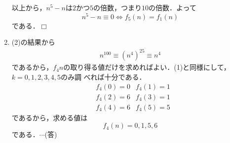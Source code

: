 \documentclass[a4j]{jarticle}
\begin{document}
\begin{multicols}{2}
\begin{enumerate}[(1)]
     以上から，$n^5-n$は$2$かつ$5$の倍数，つまり$10$の倍数．よって　
          \[n^5-n\equiv 0\Longleftrightarrow f_5(n)=f_1(n)\]
     である．$\Box$
     \item (2)の結果から
          \begin{align*}
          n^{100}\equiv (n^4)^{25}\equiv n^4
          \end{align*}
     であるから，$f_4{n}$の取り得る値だけを求めればよい．(1)と同様にして，$k=0,1,2,3,4,5$のみ調
     べれば十分である．
          \begin{align*}
          &f_4(0)=0 &f_4(1)=1 \\
          &f_4(2)=6 &f_4(3)=1  \\
          &f_4(4)=6 & f_4(5)=5
          \end{align*}
     であるから，求める値は
          \[f_4(n)=0,1,5,6\]
     である．$\cdots$(答)
     \end{enumerate}
     
\newpage
\end{multicols}
\end{document}
